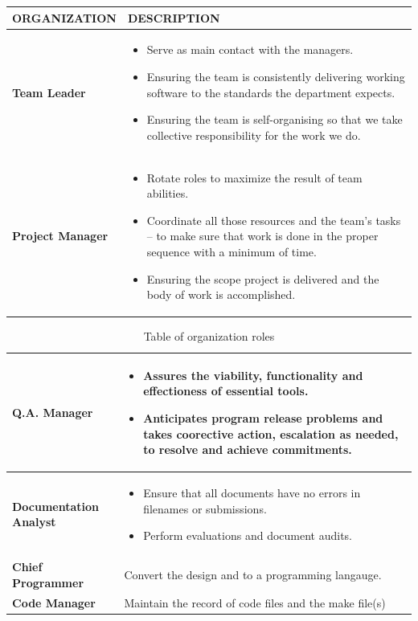 \begin{table}[H]
	\centering
	\begin{tabular}{|p{4cm}|p{9.5cm}|}
		\hline
		{\bf ORGANIZATION}             & \bf DESCRIPTION                              \\ \hline
		{\bf Team Leader}           &  \begin{itemize}
			\item Serve as main contact with the managers.
			\item Ensuring the team is consistently delivering working software to the standards the department expects.
			\item Ensuring the team is self-organising so that we take collective responsibility for the work we do.
		\end{itemize}\\ \hline
		{\bf Project Manager} & \begin{itemize}
			\item Rotate roles to maximize the result of team abilities.
			\item Coordinate all those resources and the team’s tasks – to make sure that work is done in the proper sequence with a minimum of time.
			\item Ensuring the scope project is delivered and the body of  work is accomplished.
		\end{itemize}\\ \hline
		 \end{tabular}\end{table}
	\pagebreak \clearpage
	\begin{table}[H]
	\begin{tabular}{|p{4cm}|p{9.5cm}|}
		\hline
		{\bf Q.A. Manager}           &  \begin{itemize}
			\item Assures the viability, functionality and effectioness of essential tools.
			\item Anticipates program release problems and takes coorective action, escalation as needed, to resolve and achieve commitments.
		\end{itemize}\\ \hline
		{\bf Documentation
			Analyst}& \begin{itemize}
			\item Ensure that all documents have no errors in filenames or submissions.
			\item Perform evaluations and document audits.
		\end{itemize}\\ \hline
		
		{\bf Chief Programmer}  &  Convert the design and to a programming langauge.\\ \hline
		{\bf Code Manager} & Maintain the record of code files and the make file(s)\\ \hline

	\end{tabular}
	\caption{Table of organization roles}
	\label{Table of organization roles}
\end{table}

